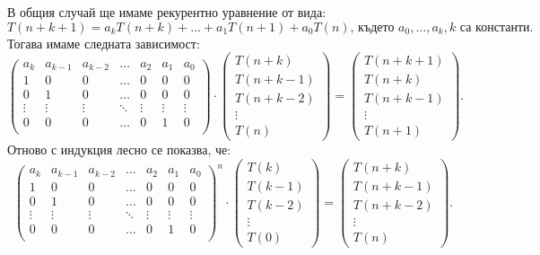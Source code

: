 В общия случай ще имаме рекурентно уравнение от вида:
\[
    T(n + k + 1) = a_k T(n + k) + \dots + a_1 T(n + 1) + a_0 T(n) \text{, където } a_0, \dots, a_k, k \text{ са константи}.
\]
Тогава имаме следната зависимост:
\[
    \begin{pmatrix}
        a_k    & a_{k - 1} & a_{k - 2} & \dots  & a_2    & a_1    & a_0    \\
        1      & 0         & 0         & \dots  & 0      & 0      & 0      \\
        0      & 1         & 0         & \dots  & 0      & 0      & 0      \\
        \vdots & \vdots    & \vdots    & \ddots & \vdots & \vdots & \vdots \\
        0      & 0         & 0         & \dots  & 0      & 1      & 0      \\
    \end{pmatrix}
    \cdot
    \begin{pmatrix}
        T(n + k)     \\
        T(n + k - 1) \\
        T(n + k - 2) \\
        \vdots       \\
        T(n)
    \end{pmatrix}
    =
    \begin{pmatrix}
        T(n + k + 1) \\
        T(n + k)     \\
        T(n + k - 1) \\
        \vdots       \\
        T(n + 1)
    \end{pmatrix}.
\]
Отново с индукция лесно се показва, че:
\[
    \begin{pmatrix}
        a_k    & a_{k - 1} & a_{k - 2} & \dots  & a_2    & a_1    & a_0    \\
        1      & 0         & 0         & \dots  & 0      & 0      & 0      \\
        0      & 1         & 0         & \dots  & 0      & 0      & 0      \\
        \vdots & \vdots    & \vdots    & \ddots & \vdots & \vdots & \vdots \\
        0      & 0         & 0         & \dots  & 0      & 1      & 0      \\
    \end{pmatrix}^n
    \cdot
    \begin{pmatrix}
        T(k)     \\
        T(k - 1) \\
        T(k - 2) \\
        \vdots   \\
        T(0)
    \end{pmatrix}
    =
    \begin{pmatrix}
        T(n + k)     \\
        T(n + k - 1) \\
        T(n + k - 2) \\
        \vdots       \\
        T(n)
    \end{pmatrix}.
\]


